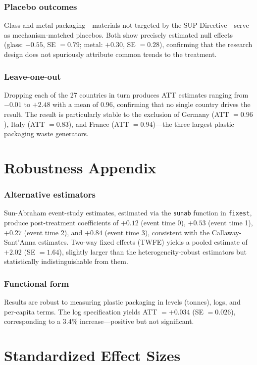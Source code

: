 \documentclass[12pt]{article}
\begin{document}
\subsubsection*{Placebo outcomes} Glass and metal packaging---materials not targeted by the SUP Directive---serve as mechanism-matched placebos. Both show precisely estimated null effects (glass: $-0.55$, SE $= 0.79$; metal: $+0.30$, SE $= 0.28$), confirming that the research design does not spuriously attribute common trends to the treatment.

\subsubsection*{Leave-one-out} Dropping each of the 27 countries in turn produces ATT estimates ranging from $-0.01$ to $+2.48$ with a mean of $0.96$, confirming that no single country drives the result. The result is particularly stable to the exclusion of Germany (ATT $= 0.96$), Italy (ATT $= 0.83$), and France (ATT $= 0.94$)---the three largest plastic packaging waste generators.


\section{Robustness Appendix}
\label{app:robustness}

\subsubsection*{Alternative estimators} Sun-Abraham event-study estimates, estimated via the \texttt{sunab} function in \texttt{fixest}, produce post-treatment coefficients of $+0.12$ (event time 0), $+0.53$ (event time 1), $+0.27$ (event time 2), and $+0.84$ (event time 3), consistent with the Callaway-Sant'Anna estimates. Two-way fixed effects (TWFE) yields a pooled estimate of $+2.02$ (SE $= 1.64$), slightly larger than the heterogeneity-robust estimators but statistically indistinguishable from them.

\subsubsection*{Functional form} Results are robust to measuring plastic packaging in levels (tonnes), logs, and per-capita terms. The log specification yields ATT $= +0.034$ (SE $= 0.026$), corresponding to a 3.4\% increase---positive but not significant.


\section{Standardized Effect Sizes}
\label{sec:sde}


\end{document}
